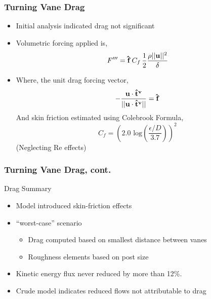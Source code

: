 \documentclass[mathserif]{beamer}
\begin{document}
%
%
%
\begin{frame}
 \frametitle{Turning Vane Drag}
 \begin{block}{}
   \begin{itemize}
   \item Initial analysis indicated drag not significant%
   \item Volumetric forcing applied is, 
     \begin{equation}
       F''' = {\bf \hat f} \, C_f \, \frac{1}{2} \frac{\rho || {\bf u} ||^2}{\delta}
     \end{equation}
   \item Where, the unit drag forcing vector,
     \begin{equation}
       - \frac{{\bf u} \cdot {\bf \hat t^v}}{|| {\bf u} \cdot {\bf \hat t^v}
         ||} = {\bf \hat f}
     \end{equation}
     And skin friction estimated using Colebrook Formula, 
     \begin{equation}
       C_f = \left(2.0 \text{ log}\left(\frac{\epsilon/D}{3.7}\right)\right)^2
     \end{equation}
     (Neglecting Re effects)
   \end{itemize}
 \end{block}
\end{frame}


\begin{frame}
  \frametitle{Turning Vane Drag, cont.}
  \begin{block}{Drag Summary}
    \begin{itemize}
    \item Model introduced skin-friction effects
    \item ``worst-case'' scenario
      \begin{itemize}
      \item Drag computed based on smallest distance between vanes
      \item Roughness elements based on post size
      \end{itemize}
    \item Kinetic energy flux never reduced by more than 12\%.
    \item Crude model indicates reduced flows not attributable to drag
    \end{itemize}
  \end{block}
  
\end{frame}
\end{document}
